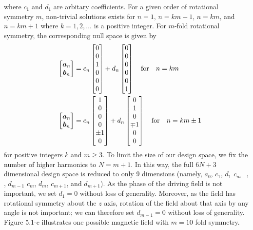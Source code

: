 where $c_1$ and $d_1$ are arbitary coefficients. For a given order of rotational symmetry $m$, non-trivial solutions exists for $n=1$, $n=k m-1$, $n=k m$, and $n=k m + 1$  where $k= 1,2,\dots$ is a positive integer. For $m$-fold rotational symmetry, the corresponding null space is given by
\begin{align}
    \quad \begin{bmatrix} \boldsymbol{a}_{n} \\ \boldsymbol{b}_{n} \end{bmatrix} &= c_{n} \begin{bmatrix} 0\\0\\1\\0\\0\\0 \end{bmatrix} + d_{n} \begin{bmatrix} 0\\0\\0\\0\\0\\1 \end{bmatrix} \quad \text{for} \quad n=km
    \\
    \quad \begin{bmatrix} \boldsymbol{a}_{n} \\ \boldsymbol{b}_{n} \end{bmatrix} &= c_{n} \begin{bmatrix} 1\\0\\0\\0\\\pm1\\0 \end{bmatrix} + d_{n} \begin{bmatrix} 0\\1\\0\\\mp1\\0\\0 \end{bmatrix} \quad \text{for} \quad n=km \pm 1
\end{align}
for positive integers $k$ and $m\geq3$. To limit the size of our design space, we fix the number of higher harmonics to $N=m+1$. In this way, the full $6N+3$ dimensional design space is reduced to only 9 dimensions (namely, $a_0$, $c_1$, $d_1$ $c_{m-1}$, $d_{m-1}$ $c_{m}$, $d_{m}$, $c_{m+1}$, and $d_{m+1}$). As the phase of the driving field is not important, we set $d_1=0$ without loss of generality.  Moreover, as the field has rotational symmetry about the $z$ axis, rotation of the field about that axis by any angle is not important; we can therefore set $d_{m-1}=0$ without loss of generality.  Figure 5.1-c illustrates one possible magnetic field with $m=10$ fold symmetry.

